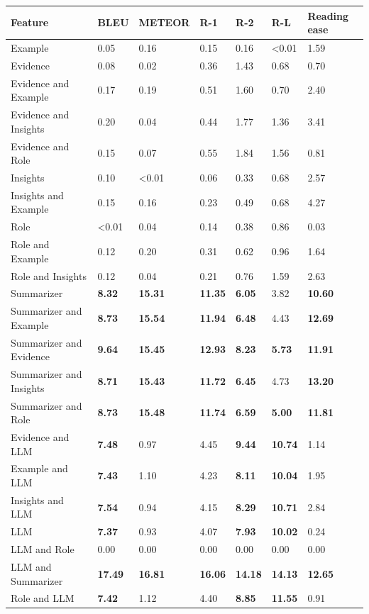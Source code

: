 \begin{tabular}{|l|l|l|l|l|l|l|}
\hline
\textbf{Feature} & BLEU & METEOR & R-1 & R-2 & R-L & Reading ease \\
 \hline
 Example & 0.05 & 0.16 & 0.15 & 0.16 & \textless{}0.01 & 1.59 \\
 \hline
 Evidence & 0.08 & 0.02 & 0.36 & 1.43 & 0.68 & 0.70 \\
 \hline
 Evidence and Example & 0.17 & 0.19 & 0.51 & 1.60 & 0.70 & 2.40 \\
 \hline
 Evidence and Insights & 0.20 & 0.04 & 0.44 & 1.77 & 1.36 & 3.41 \\
 \hline
 Evidence and Role & 0.15 & 0.07 & 0.55 & 1.84 & 1.56 & 0.81 \\
 \hline
 Insights & 0.10 & \textless{}0.01 & 0.06 & 0.33 & 0.68 & 2.57 \\
 \hline
 Insights and Example & 0.15 & 0.16 & 0.23 & 0.49 & 0.68 & 4.27 \\
 \hline
 Role & \textless{}0.01 & 0.04 & 0.14 & 0.38 & 0.86 & 0.03 \\
 \hline
 Role and Example & 0.12 & 0.20 & 0.31 & 0.62 & 0.96 & 1.64 \\
 \hline
 Role and Insights & 0.12 & 0.04 & 0.21 & 0.76 & 1.59 & 2.63 \\
 \hline
 Summarizer & \textbf{8.32} & \textbf{15.31} & \textbf{11.35} & \textbf{6.05} & 3.82 & \textbf{10.60} \\
 \hline
 Summarizer and Example & \textbf{8.73} & \textbf{15.54} & \textbf{11.94} & \textbf{6.48} & 4.43 & \textbf{12.69} \\
 \hline
 Summarizer and Evidence & \textbf{9.64} & \textbf{15.45} & \textbf{12.93} & \textbf{8.23} & \textbf{5.73} & \textbf{11.91} \\
 \hline
 Summarizer and Insights & \textbf{8.71} & \textbf{15.43} & \textbf{11.72} & \textbf{6.45} & 4.73 & \textbf{13.20} \\
 \hline
 Summarizer and Role & \textbf{8.73} & \textbf{15.48} & \textbf{11.74} & \textbf{6.59} & \textbf{5.00} & \textbf{11.81} \\
 \hline
 Evidence and LLM & \textbf{7.48} & 0.97 & 4.45 & \textbf{9.44} & \textbf{10.74} & 1.14 \\
 \hline
 Example and LLM & \textbf{7.43} & 1.10 & 4.23 & \textbf{8.11} & \textbf{10.04} & 1.95 \\
 \hline
 Insights and LLM & \textbf{7.54} & 0.94 & 4.15 & \textbf{8.29} & \textbf{10.71} & 2.84 \\
 \hline
 LLM & \textbf{7.37} & 0.93 & 4.07 & \textbf{7.93} & \textbf{10.02} & 0.24 \\
 \hline
 LLM and Role & 0.00 & 0.00 & 0.00 & 0.00 & 0.00 & 0.00 \\
 \hline
 LLM and Summarizer & \textbf{17.49} & \textbf{16.81} & \textbf{16.06} & \textbf{14.18} & \textbf{14.13} & \textbf{12.65} \\
 \hline
 Role and LLM & \textbf{7.42} & 1.12 & 4.40 & \textbf{8.85} & \textbf{11.55} & 0.91 \\
\hline
\end{tabular}
